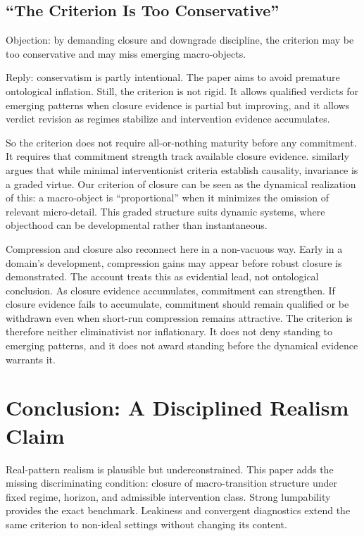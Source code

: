 \subsection{``The Criterion Is Too
	Conservative''}\label{the-criterion-is-too-conservative}

Objection: by demanding closure and downgrade discipline, the criterion
may be too conservative and may miss emerging macro-objects.

Reply: conservatism is partly intentional. The paper aims to avoid
premature ontological inflation. Still, the criterion is not rigid. It
allows qualified verdicts for emerging patterns when closure evidence is
partial but improving, and it allows verdict revision as regimes
stabilize and intervention evidence accumulates.

So the criterion does not require all-or-nothing maturity before any
commitment. It requires that commitment strength track available closure
evidence. \citet{woodward2021} similarly argues that while minimal
interventionist criteria establish causality, invariance is a graded
virtue. Our criterion of closure can be seen as the dynamical
realization of this: a macro-object is ``proportional'' when it
minimizes the omission of relevant micro-detail. This graded structure
suits dynamic systems, where objecthood can be developmental rather
than instantaneous.

Compression and closure also reconnect here in a non-vacuous way. Early
in a domain's development, compression gains may appear before robust
closure is demonstrated. The account treats this as evidential lead,
not ontological conclusion. As closure evidence accumulates, commitment
can strengthen. If closure evidence fails to accumulate, commitment
should remain qualified or be withdrawn even when short-run compression
remains attractive. The criterion is therefore neither eliminativist nor
inflationary. It does not deny standing to emerging patterns, and it
does not award standing before the dynamical evidence warrants it.

\section{Conclusion: A Disciplined Realism
  Claim}\label{conclusion-a-disciplined-realism-claim}

Real-pattern realism is plausible but underconstrained. This paper adds
the missing discriminating condition: closure of macro-transition
structure under fixed regime, horizon, and admissible intervention
class. Strong lumpability provides the exact benchmark. Leakiness and
convergent diagnostics extend the same criterion to non-ideal settings
without changing its content.


